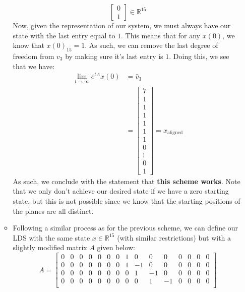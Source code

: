 \documentclass[12pt]{exam}
\begin{document}
\begin{questions}
\begin{solution}
\begin{enumerate}[label=(\alph*)]
\begin{itemize}
\[\begin{bmatrix}
                0 \\
                1
              \end{bmatrix} \in \mathbb{R}^{15}
          \]
          Now, given the representation of our system, we must always have our state with the last entry equal to $1$. This means that for any $x(0)$, we know that $x(0)_{15} = 1$. As such, we can remove the last degree of freedom from $v_3$ by making sure it's last entry is $1$. Doing this, we see that we have:
          \begin{align*}
            \lim_{t \to \infty} e^{tA}x(0) &= \hat{v}_3 \\
            &= \begin{bmatrix}
                7 \\
                1 \\
                1 \\
                1 \\
                1 \\
                1 \\
                1 \\
                0 \\
                \vdots  \\
                0 \\
                1
              \end{bmatrix} = x_{\text{aligned}}
          \end{align*}
          As such, we conclude with the statement that \textbf{this scheme works}. Note that we only don't achieve our desired state if we have a zero starting state, but this is not possible since we know that the starting positions of the planes are all distinct.
        \item Following a similar process as for the previous scheme, we can define our LDS with the same state $x \in \mathbb{R}^{15}$ (with similar restrictions) but with a slightly modified matrix $A$ given below:
          \[
            A =
              \begin{bmatrix}
                0 & 0 & 0 & 0 & 0 & 0 & 0 & 1 & 0 & 0 & 0 & 0 & 0 & 0 & 0 \\
                0 & 0 & 0 & 0 & 0 & 0 & 0 & 1 &-1 & 0 & 0 & 0 & 0 & 0 & 0 \\
                0 & 0 & 0 & 0 & 0 & 0 & 0 & 0 & 1 &-1 & 0 & 0 & 0 & 0 & 0 \\
                0 & 0 & 0 & 0 & 0 & 0 & 0 & 0 & 0 & 1 &-1 & 0 & 0 & 0 & 0 \\

\end{bmatrix}\]
\end{itemize}
\end{enumerate}
\end{solution}
\end{questions}
\end{document}
